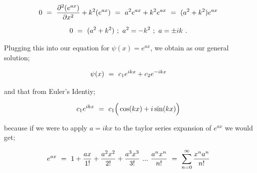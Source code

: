 \documentclass{article}
\begin{document}
\begin{equation} \label{eq:220}
0 \hspace{0.125cm} = \hspace{0.125cm} \frac{\partial^2{(e^{ax})}}{\partial{x^2}} + k^2 (e^{ax}) \hspace{0.125cm} = \hspace{0.125cm}  a^2 e^{ax} +  k^2 e^{ax} \hspace{0.125cm} = \hspace{0.125cm} (a^2 + k^2) e^{ax}   
\end{equation}

\begin{equation} \label{eq:221}
0 \hspace{0.125cm} = \hspace{0.125cm} (a^2 + k^2) \hspace{0.125cm} ;  \hspace{0.125cm} a^2 = -k^2 \hspace{0.125cm} ; \hspace{0.125cm} a = \pm ik \hspace{0.125cm} .
\end{equation}

Plugging this into our equation for \begin{math} \psi(x) = e^{ax}  \end{math}, we obtain as our general solution;

\begin{equation} \label{eq:222}
\psi(x) \hspace{0.125cm} = \hspace{0.125cm} c_1 e^{ikx} + c_2 e^{-ikx}
\end{equation}

and that from Euler's Identiy; 

\begin{equation} \label{eq:223}
c_1 e^{ikx} \hspace{0.125cm} = \hspace{0.125cm} c_1 \Big( \cos(kx) + i\sin(kx) \Big) 
\end{equation}

because if we were to apply \begin{math} a = ikx \end{math} to the taylor series expansion of \begin{math} e^{ax} \end{math} we would get; 

\begin{equation} \label{eq:224}
e^{ax} \hspace{0.125cm} = \hspace{0.125cm} 1 + \frac{ax}{1!} + \frac{a^2x^2}{2!} + \frac{a^3x^3}{3!} \hspace{0.125cm} ... \hspace{0.125cm} \frac{a^{n}x^{n}}{n!} \hspace{0.125cm} = \hspace{0.125cm} \sum_{n=0}^{\infty} \frac{x^{n}a^{n}}{n!}
\end{equation}
\end{document}
